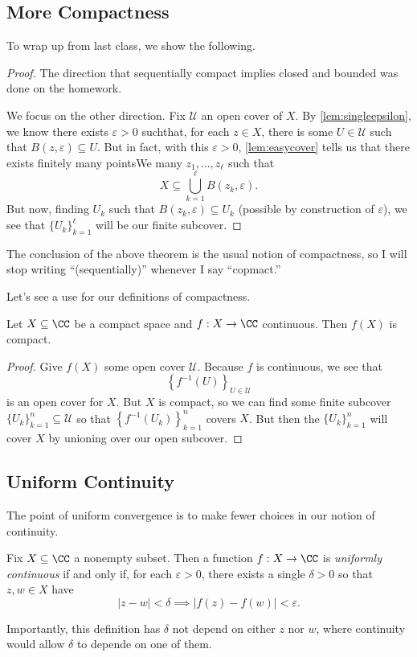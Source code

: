 
\subsection{More Compactness}
To wrap up from last class, we show the following.
\heineborel*
\begin{proof}
	The direction that sequentially compact implies closed and bounded was done on the homework.
	
	We focus on the other direction. Fix $\mathcal U$ an open cover of $X$. By \autoref{lem:singleepsilon}, we know there exists $\varepsilon>0$ suchthat, for each $z\in X$, there is some $U\in\mathcal U$ such that $B(z,\varepsilon)\subseteq U$. But in fact, with this $\varepsilon>0$, \autoref{lem:easycover} tells us that there exists finitely many pointsWe many $z_1,\ldots,z_\ell$ such that
	\[X\subseteq\bigcup_{k=1}^\ell B(z_k,\varepsilon).\]
	But now, finding $U_k$ such that $B(z_k,\varepsilon)\subseteq U_k$ (possible by construction of $\varepsilon$), we see that $\{U_k\}_{k=1}^\ell$ will be our finite subcover.
\end{proof}
\begin{remark}
	The conclusion of the above theorem is the usual notion of compactness, so I will stop writing ``(sequentially)'' whenever I say ``copmact.''
\end{remark}
Let's see a use for our definitions of compactness.
\begin{corollary}
	Let $X\subseteq\CC$ be a compact space and $f:X\to\CC$ continuous. Then $f(X)$ is compact.
\end{corollary}
\begin{proof}
	Give $f(X)$ some open cover $\mathcal U$. Because $f$ is continuous, we see that
	\[\left\{f^{-1}(U)\right\}_{U\in\mathcal U}\]
	is an open cover for $X$. But $X$ is compact, so we can find some finite subcover $\{U_k\}_{k=1}^n\subseteq\mathcal U$ so that $\left\{f^{-1}(U_k)\right\}_{k=1}^n$ covers $X$. But then the $\{U_k\}_{k=1}^n$ will cover $X$ by unioning over our open subcover.
\end{proof}

\subsection{Uniform Continuity}
The point of uniform convergence is to make fewer choices in our notion of continuity.
\begin{definition}
	Fix $X\subseteq\CC$ a nonempty subset. Then a function $f:X\to\CC$ is \textit{uniformly continuous} if and only if, for each $\varepsilon>0$, there exists a single $\delta>0$ so that $z,w\in X$ have
	\[|z-w|<\delta\implies|f(z)-f(w)|<\varepsilon.\]
\end{definition}
Importantly, this definition has $\delta$ not depend on either $z$ nor $w$, where continuity would allow $\delta$ to depende on one of them.

